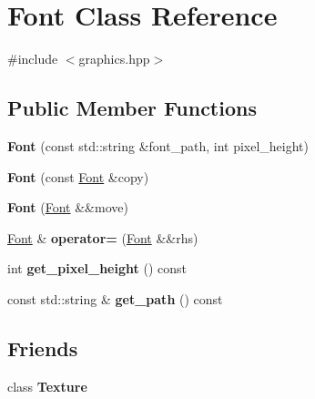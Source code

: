 \hypertarget{class_font}{}\section{Font Class Reference}
\label{class_font}


{\ttfamily \#include $<$graphics.\+hpp$>$}

\subsection*{Public Member Functions}
\begin{DoxyCompactItemize}
\item 
\mbox{\label{class_font_a42440c9f8cbae982974288d28d65816a}} 
{\bfseries Font} (const std\+::string \&font\+\_\+path, int pixel\+\_\+height)
\item 
\mbox{\label{class_font_a90f63d6bc3c7813ec94906b2305d270e}} 
{\bfseries Font} (const \mbox{\hyperlink{class_font}{Font}} \&copy)
\item 
\mbox{\label{class_font_ac7ae7201a9874e59f332e264885ec686}} 
{\bfseries Font} (\mbox{\hyperlink{class_font}{Font}} \&\&move)
\item 
\mbox{\label{class_font_afeea92cfdfe189b73a34f074482fe5dd}} 
\mbox{\hyperlink{class_font}{Font}} \& {\bfseries operator=} (\mbox{\hyperlink{class_font}{Font}} \&\&rhs)
\item 
\mbox{\label{class_font_a8d59ee5734bff61e6de70de065d13260}} 
int {\bfseries get\+\_\+pixel\+\_\+height} () const
\item 
\mbox{\label{class_font_a891af996fb417492d9390620c957e5f3}} 
const std\+::string \& {\bfseries get\+\_\+path} () const
\end{DoxyCompactItemize}
\subsection*{Friends}
\begin{DoxyCompactItemize}
\item 
\mbox{\label{class_font_af7f909106d08e36cd50aa58e36f9bf47}} 
class {\bfseries Texture}
\end{DoxyCompactItemize}


